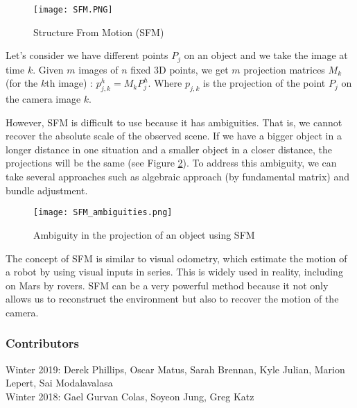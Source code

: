 \documentclass[twoside]{article}
\begin{document}
\begin{figure}[h!]
  \begin{center}
	\texttt{[image: SFM.PNG]}  \end{center}
  \caption{Structure From Motion (SFM)}
  \label{ex}
\end{figure}

Let's consider we have different points $P_j$ on an object and we take the image at time $k$. Given $m$ images of $n$ fixed 3D points, we get $m$ projection matrices $M_k$ (for the $k$th image) : $p_{j,k}^h = M_k P_j^h$.
Where $p_{j,k}$ is the projection of the point $P_j$ on the camera image $k$.

However, SFM is difficult to use because it has ambiguities. That is, we cannot recover the absolute scale of the observed scene. If we have a bigger object in a longer distance in one situation and a smaller object in a closer distance, the projections will be the same (see Figure \ref{amb}). To address this ambiguity, we can take several approaches such as algebraic approach (by fundamental matrix) and bundle adjustment.

\begin{figure}[h!]
  \begin{center}
	\texttt{[image: SFM\_ambiguities.png]}
  \end{center}
  \caption{Ambiguity in the projection of an object using SFM}
  \label{amb}
\end{figure}

The concept of SFM is similar to visual odometry, which estimate the motion of a robot by using visual inputs in series. This is widely used in reality, including on Mars by rovers. SFM can be a very powerful method because it not only allows us to reconstruct the environment but also to recover the motion of the camera.

\newpage




\subsubsection*{Contributors}
Winter 2019: Derek Phillips, Oscar Matus, Sarah Brennan, Kyle Julian, Marion Lepert, Sai Modalavalasa
\\
Winter 2018: Gael Gurvan Colas, Soyeon Jung, Greg Katz
\end{document}
